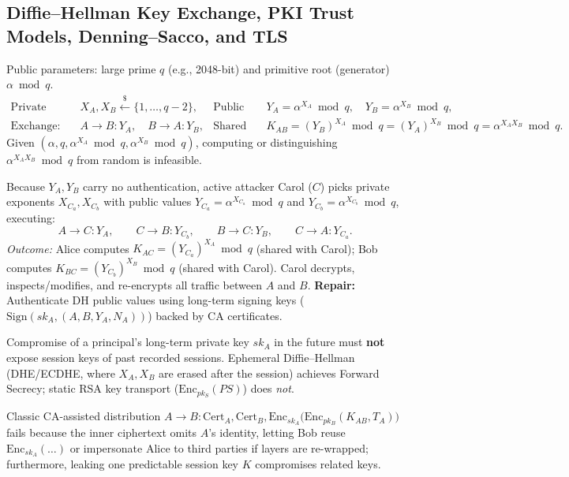 \subsection{Diffie--Hellman Key Exchange, PKI Trust Models, Denning--Sacco, and TLS}
\begin{compactitem}
  \item {} Public parameters: large prime $q$ (e.g., 2048-bit) and primitive root (generator) $\alpha \bmod q$.
  \begin{align*}
    \text{Private keys:} \quad & X_A, X_B \xleftarrow{\$} \{1, \dots, q-2\}, &
    \text{Public keys:} \quad & Y_A = \alpha^{X_A} \bmod q, \quad Y_B = \alpha^{X_B} \bmod q, \\
    \text{Exchange:} \quad & A \to B : Y_A, \quad B \to A : Y_B, &
    \text{Shared Secret:} \quad & K_{AB} = (Y_B)^{X_A} \bmod q = (Y_A)^{X_B} \bmod q = \alpha^{X_A X_B} \bmod q.
  \end{align*}
   Given $(\alpha, q, \alpha^{X_A} \bmod q, \alpha^{X_B} \bmod q)$, computing or distinguishing $\alpha^{X_A X_B} \bmod q$ from random is infeasible.
  \item {} Because $Y_A, Y_B$ carry no authentication, active attacker Carol ($C$) picks private exponents $X_{C_a}, X_{C_b}$ with public values $Y_{C_a} = \alpha^{X_{C_a}} \bmod q$ and $Y_{C_b} = \alpha^{X_{C_b}} \bmod q$, executing:
  \[
    A \longrightarrow C : Y_A, \qquad C \longrightarrow B : Y_{C_b}, \qquad B \longrightarrow C : Y_B, \qquad C \longrightarrow A : Y_{C_a}.
  \]
  \emph{Outcome:} Alice computes $K_{AC} = (Y_{C_a})^{X_A} \bmod q$ (shared with Carol); Bob computes $K_{BC} = (Y_{C_b})^{X_B} \bmod q$ (shared with Carol). Carol decrypts, inspects/modifies, and re-encrypts all traffic between $A$ and $B$. \textbf{Repair:} Authenticate DH public values using long-term signing keys ($\mathrm{Sign}(sk_A, (A, B, Y_A, N_A))$) backed by CA certificates.
  \item {} Compromise of a principal's long-term private key $sk_A$ in the future must \textbf{not} expose session keys of past recorded sessions. Ephemeral Diffie--Hellman (DHE/ECDHE, where $X_A, X_B$ are erased after the session) achieves Forward Secrecy; static RSA key transport ($\mathrm{Enc}_{pk_S}(PS)$) does \emph{not}.
  \item {} Classic CA-assisted distribution $A \to B : \mathrm{Cert}_A, \mathrm{Cert}_B, \mathrm{Enc}_{sk_A}\big(\mathrm{Enc}_{pk_B}(K_{AB}, T_A)\big)$ fails because the inner ciphertext omits $A$'s identity, letting Bob reuse $\mathrm{Enc}_{sk_A}(\dots)$ or impersonate Alice to third parties if layers are re-wrapped; furthermore, leaking one predictable session key $K$ compromises related keys.

\end{compactitem}
